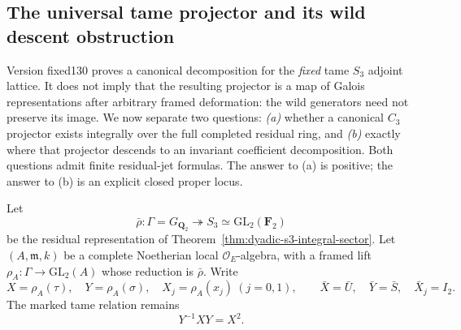 
\subsection{The universal tame projector and its wild descent obstruction}
\label{subsec:dyadic-s3-universal-tame-projector}

Version fixed130 proves a canonical decomposition for the
\emph{fixed} tame $S_3$ adjoint lattice.  It does not imply
that the resulting projector is a map of Galois
representations after arbitrary framed deformation:
the wild generators need not preserve its image.
We now separate two questions:
\emph{(a)} whether a canonical $C_3$ projector exists
integrally over the full completed residual ring, and
\emph{(b)} exactly where that projector descends to
an invariant coefficient decomposition.
Both questions admit finite residual-jet formulas.
The answer to (a) is positive; the answer to (b)
is an explicit closed proper locus.

Let
\[
\bar\rho:\Gamma=G_{\mathbf Q_2}
\twoheadrightarrow S_3
\simeq\mathrm{GL}_2(\mathbf F_2)
\]
be the residual representation of
Theorem~\ref{thm:dyadic-s3-integral-sector}.
Let $(A,\mathfrak m,k)$ be a complete
Noetherian local $\mathcal O_E$-algebra,
with a framed lift
$\rho_A:\Gamma\to\mathrm{GL}_2(A)$
whose reduction is $\bar\rho$.
Write
\[
X=\rho_A(\tau),\quad
Y=\rho_A(\sigma),\quad
X_j=\rho_A(x_j)\ (j=0,1),
\qquad
\bar X=\bar U,\quad
\bar Y=\bar S,\quad
\bar X_j=I_2.
\]
The marked tame relation remains
\begin{equation}\label{eq:dyadic-f131-tame-relation}
Y^{-1}XY=X^2.
\end{equation}

